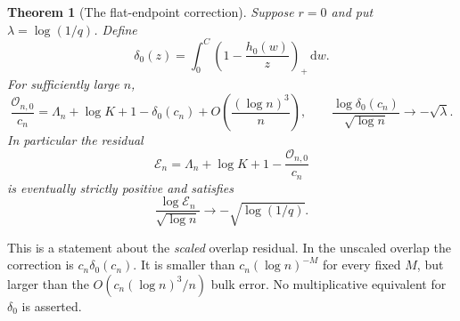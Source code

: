 \documentclass[11pt,oneside]{article}
\numberwithin{equation}{section}
\theoremstyle{plain}
\newtheorem{theorem}{Theorem}[section]
\theoremstyle{definition}
\theoremstyle{remark}
\newcommand{\OO}{\mathcal O}
\newcommand{\dd}{\,\mathrm d}
\begin{document}
\begin{theorem}[The flat-endpoint correction]\label{thm:flatmain}
Suppose $r=0$ and put $\lambda=\log(1/q)$. Define
\[
 \delta_0(z)=\int_0^C\left(1-\frac{h_0(w)}z\right)_+\dd w.
\]
For sufficiently large $n$,
\begin{equation}\label{eq:flatprecise}
 \frac{\OO_{n,0}}{c_n}
 =\Lambda_n+\log K+1-\delta_0(c_n)
      +O\!\left(\frac{(\log n)^3}{n}\right),
 \qquad
 \frac{\log\delta_0(c_n)}{\sqrt{\log n}}\longrightarrow-\sqrt\lambda.
\end{equation}
In particular the residual
\[
 \mathcal E_n=\Lambda_n+\log K+1-\frac{\OO_{n,0}}{c_n}
\]
is eventually strictly positive and satisfies
\begin{equation}\label{eq:flatresidual}
 \frac{\log\mathcal E_n}{\sqrt{\log n}}
   \longrightarrow-\sqrt{\log(1/q)}.
\end{equation}
\end{theorem}

This is a statement about the \emph{scaled} overlap residual. In the
unscaled overlap the correction is $c_n\delta_0(c_n)$. It is smaller
than $c_n(\log n)^{-M}$ for every fixed $M$, but larger than the
$O(c_n(\log n)^3/n)$ bulk error. No multiplicative equivalent for
$\delta_0$ is asserted.
\end{document}
